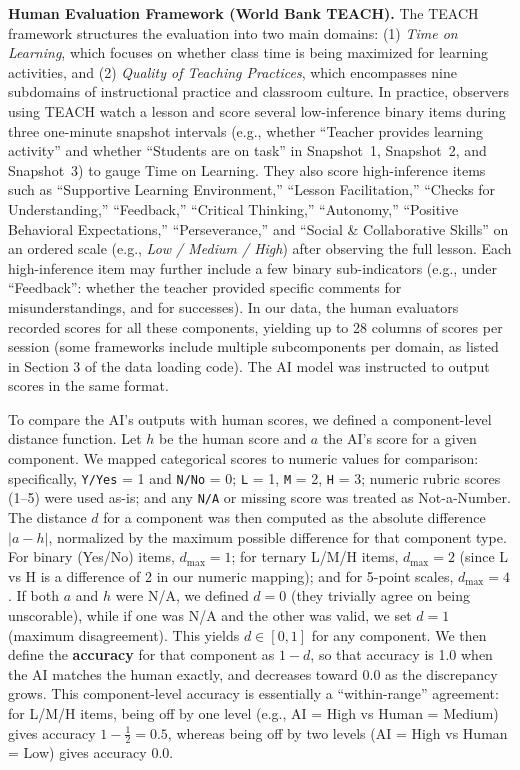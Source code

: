 \documentclass[12pt]{article}
\begin{document}
\textbf{Human Evaluation Framework (World Bank TEACH).} The TEACH framework structures the evaluation into two main domains: (1) \textit{Time on Learning}, which focuses on whether class time is being maximized for learning activities, and (2) \textit{Quality of Teaching Practices}, which encompasses nine subdomains of instructional practice and classroom culture. In practice, observers using TEACH watch a lesson and score several low-inference binary items during three one-minute snapshot intervals (e.g., whether “Teacher provides learning activity” and whether “Students are on task” in Snapshot~1, Snapshot~2, and Snapshot~3) to gauge Time on Learning. They also score high-inference items such as “Supportive Learning Environment,” “Lesson Facilitation,” “Checks for Understanding,” “Feedback,” “Critical Thinking,” “Autonomy,” “Positive Behavioral Expectations,” “Perseverance,” and “Social \& Collaborative Skills” on an ordered scale (e.g., \textit{Low / Medium / High}) after observing the full lesson. Each high-inference item may further include a few binary sub-indicators (e.g., under “Feedback”: whether the teacher provided specific comments for misunderstandings, and for successes). In our data, the human evaluators recorded scores for all these components, yielding up to 28 columns of scores per session (some frameworks include multiple subcomponents per domain, as listed in Section 3 of the data loading code). The AI model was instructed to output scores in the same format.

To compare the AI’s outputs with human scores, we defined a component-level distance function. Let \(h\) be the human score and \(a\) the AI’s score for a given component. We mapped categorical scores to numeric values for comparison: specifically, \texttt{Y/Yes} = 1 and \texttt{N/No} = 0; \texttt{L} = 1, \texttt{M} = 2, \texttt{H} = 3; numeric rubric scores (1–5) were used as-is; and any \texttt{N/A} or missing score was treated as Not-a-Number. The distance \(d\) for a component was then computed as the absolute difference \(\lvert a - h \rvert\), normalized by the maximum possible difference for that component type. For binary (Yes/No) items, \(d_{\max} = 1\); for ternary L/M/H items, \(d_{\max} = 2\) (since L vs H is a difference of 2 in our numeric mapping); and for 5-point scales, \(d_{\max} = 4\). If both \(a\) and \(h\) were  N/A, we defined \(d = 0\) (they trivially agree on being unscorable), while if one was N/A and the other was valid, we set \(d = 1\) (maximum disagreement). This yields \(d \in [0,1]\) for any component. We then define the \textbf{accuracy} for that component as \(1 - d\), so that accuracy is 1.0 when the AI matches the human exactly, and decreases toward 0.0 as the discrepancy grows. This component-level accuracy is essentially a “within-range” agreement: for L/M/H items, being off by one level (e.g., AI = High vs Human = Medium) gives accuracy \(1 - \tfrac{1}{2} = 0.5\), whereas being off by two levels (AI = High vs Human = Low) gives accuracy \(0.0\).
\end{document}

